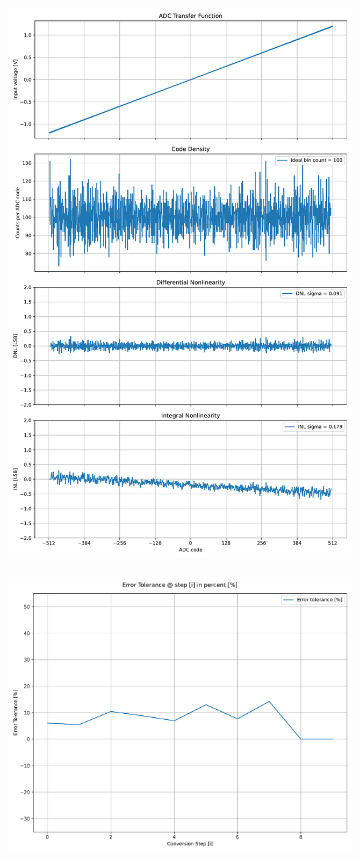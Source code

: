 \documentclass[varwidth]{standalone}
\begin{document}
\begin{figure}
\begin{subfigure}{0.32\textwidth}
    \includegraphics[width=\textwidth]{behavioral_10b_noisy_binrecomb_nonlinearity.pdf}
\end{subfigure}
\begin{subfigure}{0.32\textwidth}
    \includegraphics[width=\textwidth]{behavioral_10b_noisy_binrecomb_redundancy.pdf}

\end{subfigure}
\end{figure}
\end{document}
